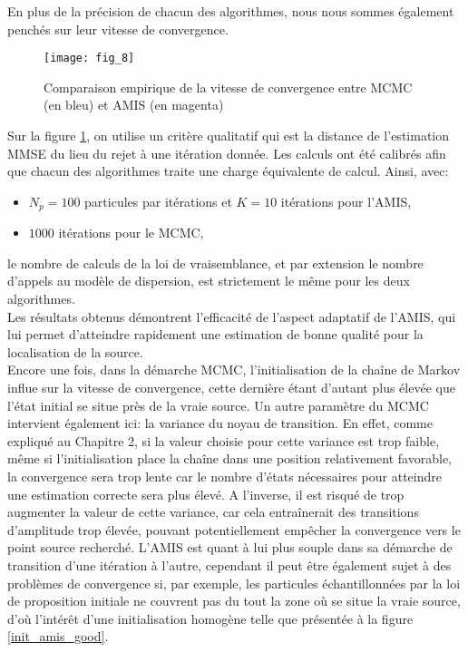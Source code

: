  En plus de la précision de chacun des algorithmes, nous nous sommes également penchés sur leur vitesse de convergence. \\
 
 \begin{figure}[h!]
 	\centering
 	\texttt{[image: fig\_8]}
 	\caption{Comparaison empirique de la vitesse de convergence entre MCMC (en bleu) et AMIS (en magenta)}
 	\label{fig_8_AE} 	
 \end{figure}

 Sur la figure \ref{fig_8_AE}, on utilise un critère qualitatif qui est la distance de l'estimation MMSE du lieu du rejet à une itération donnée. Les calculs ont été calibrés afin que chacun des algorithmes traite une charge équivalente de calcul. Ainsi, avec:
 \begin{itemize}
 	\item $N_p=100$ particules par itérations et $K=10$ itérations pour l'AMIS,
 	\item $1000$ itérations pour le MCMC,
 \end{itemize} 
 le nombre de calculs de la loi de vraisemblance, et par extension le nombre d'appels au modèle de dispersion, est strictement le même pour les deux algorithmes. \\
 
 Les résultats obtenus démontrent l'efficacité de l'aspect adaptatif de l'AMIS, qui lui permet d'atteindre rapidement une estimation de bonne qualité pour la localisation de la source.\\
 
 Encore une fois, dans la démarche MCMC, l'initialisation de la chaîne de Markov influe sur la vitesse de convergence, cette dernière étant d'autant plus élevée que l'état initial se situe près de la vraie source. Un autre paramètre du MCMC intervient également ici: la variance du noyau de transition. En effet, comme expliqué au Chapitre 2, si la valeur choisie pour cette variance est trop faible, même si l'initialisation place la chaîne dans une position relativement favorable, la convergence sera trop lente car le nombre d'états nécessaires pour atteindre une estimation correcte sera plus élevé. A l'inverse, il est risqué de trop augmenter la valeur de cette variance, car cela entraînerait des transitions d'amplitude trop élevée, pouvant potentiellement empêcher la convergence vers le point source recherché. L'AMIS est quant à lui plus souple dans sa démarche de transition d'une itération à l'autre, cependant il peut être également sujet à des problèmes de convergence si, par exemple, les particules échantillonnées par la loi de proposition initiale ne couvrent pas du tout la zone où se situe la vraie source, d'où l'intérêt d'une initialisation homogène telle que présentée à la figure \ref{init_amis_good}.\\
 
